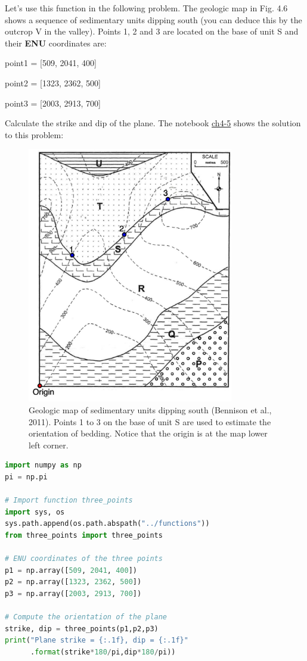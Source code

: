 \documentclass[a4paper , 12pt]{book}
\begin{document}
Let's use this function in the following problem. The geologic map in Fig. 4.6 shows a sequence of sedimentary units dipping south (you can deduce this by the outcrop V in the valley). Points 1, 2 and 3 are located on the base of unit S and their \textbf{ENU} coordinates are: 

point1 = [509, 2041, 400]

point2 = [1323, 2362, 500]

point3 = [2003, 2913, 700] 

Calculate the strike and dip of the plane. The notebook \href{https://github.com/nfcd/compGeo/blob/master/source/notebooks/ch4-5.ipynb}{ch4-5} shows the solution to this problem:\\ 

\begin{figure}[ht]
    \centering
    \includegraphics[width=9cm]{ch4f7.pdf}
    \caption{Geologic map of sedimentary units dipping south (Bennison et al., 2011). Points 1 to 3 on the base of unit S are used to estimate the orientation of bedding. Notice that the origin is at the map lower left corner.}
\end{figure}

\begin{center}
\begin{lstlisting}[language=Python, frame=single]
import numpy as np
pi = np.pi

# Import function three_points
import sys, os
sys.path.append(os.path.abspath("../functions"))
from three_points import three_points

# ENU coordinates of the three points
p1 = np.array([509, 2041, 400])
p2 = np.array([1323, 2362, 500])
p3 = np.array([2003, 2913, 700])

# Compute the orientation of the plane
strike, dip = three_points(p1,p2,p3)
print("Plane strike = {:.1f}, dip = {:.1f}"
      .format(strike*180/pi,dip*180/pi))
\end{lstlisting}
\end{center}
\end{document}

